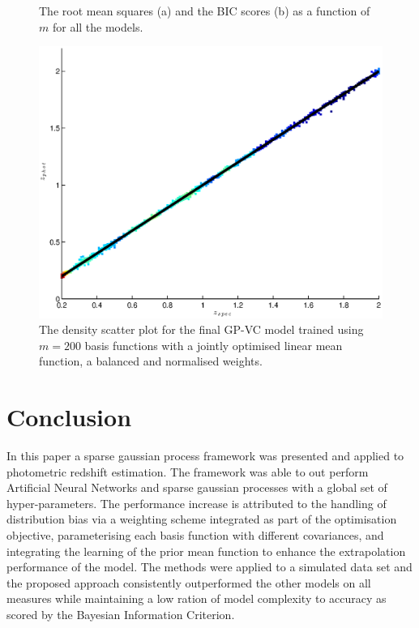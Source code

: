 \documentclass[useAMS,usenatbib,fleqn]{mn2e}
\begin{document}
\begin{figure}
       \caption{The root mean squares (a) and the BIC scores (b) as a function of $m$ for all the models.} 
	
\end{figure}

\begin{figure}
       \centering
        \includegraphics[width=\columnwidth]{figures/final-model.eps}
        \caption{The density scatter plot for the final GP-VC model trained using $m=200$ basis functions with a jointly optimised linear mean function, a balanced and normalised weights. } 
       \label{fig-final-model}
\end{figure}


\section{Conclusion}
In this paper a sparse gaussian process framework was presented and applied to photometric redshift estimation. The framework was able to out perform Artificial Neural Networks and sparse gaussian processes with a global set of hyper-parameters. The performance increase is attributed to the handling of distribution bias via a weighting scheme integrated as part of the optimisation objective, parameterising each basis function with different covariances, and integrating the learning of the prior mean function to enhance the extrapolation performance of the model. The methods were applied to a simulated data set and the proposed approach consistently outperformed the other models on all measures while maintaining a low ration of model complexity to accuracy as scored by the Bayesian Information Criterion.
\label{sec-conclusion}

\footnotesize{

	
}
\end{document}
